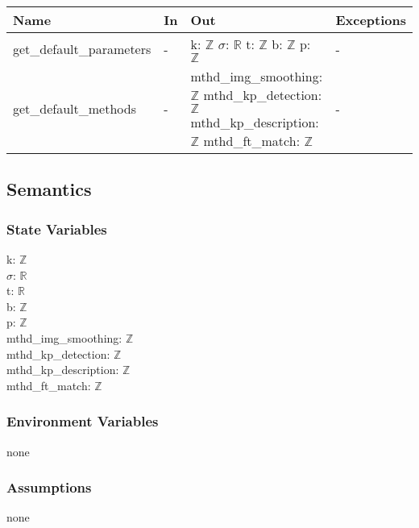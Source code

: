 \documentclass[12pt, titlepage]{article}
\begin{document}
\begin{center}
\begin{tabular}{p{4cm} p{3.5cm} p{4.5cm} p{3.5cm}}
\hline
\textbf{Name} & \textbf{In} & \textbf{Out} & \textbf{Exceptions} \\
\hline
get\_default\_parameters & - & 
k: $\mathbb{Z}$ \newline 
$\sigma$: $\mathbb{R}$ \newline 
t: $\mathbb{Z}$ \newline 
b: $\mathbb{Z}$ \newline 
p: $\mathbb{Z}$ 
& - \\
\hline
get\_default\_methods & - & 
mthd\_img\_smoothing: $\mathbb{Z}$ \newline 
mthd\_kp\_detection: $\mathbb{Z}$ \newline 
mthd\_kp\_description: $\mathbb{Z}$ \newline 
mthd\_ft\_match: $\mathbb{Z}$ & - \\
\hline
\end{tabular}
\end{center}

\subsection{Semantics}

\subsubsection{State Variables}

k: $\mathbb{Z}$ \\
$\sigma$: $\mathbb{R}$ \\
t: $\mathbb{R}$ \\
b: $\mathbb{Z}$ \\
p: $\mathbb{Z}$ \\
mthd\_img\_smoothing: $\mathbb{Z}$ \\
mthd\_kp\_detection: $\mathbb{Z}$ \\
mthd\_kp\_description: $\mathbb{Z}$ \\
mthd\_ft\_match: $\mathbb{Z}$ \\

\subsubsection{Environment Variables}
none

\subsubsection{Assumptions}
none 
\end{document}

